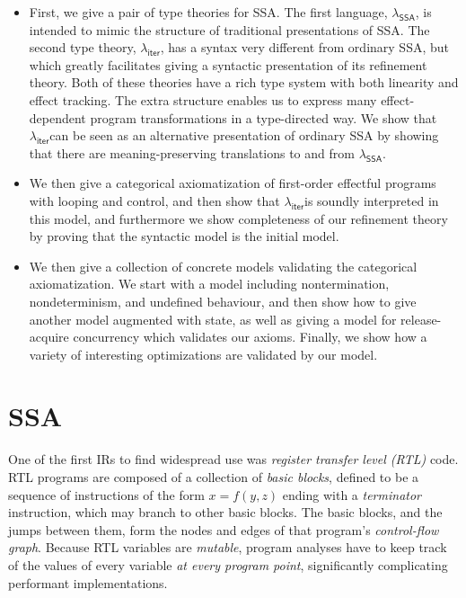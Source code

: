 \documentclass[acmsmall,screen,review]{acmart}
\newcommand{\ms}[1]{\ensuremath{\mathsf{#1}}}
\newcommand{\subiterexp}{\texorpdfstring{\(\lambda_{\ms{iter}}\)}{lambda-iter}}
\newcommand{\isotopessa}{\(\lambda_{\ms{SSA}}\)}
\begin{document}
\begin{itemize}
\item First, we give a pair of type theories for SSA. The first
  language, \isotopessa, is intended to mimic the structure of
  traditional presentations of SSA. The second type theory,
  \subiterexp, has a syntax very different from ordinary SSA, but
  which greatly facilitates giving a syntactic presentation of its
  refinement theory. Both of these theories have a rich type system
  with both linearity and effect tracking. The extra structure enables
  us to express many effect-dependent program transformations in a
  type-directed way. We show that \subiterexp can be seen as an
  alternative presentation of ordinary SSA by showing that there are
  meaning-preserving translations to and from \isotopessa.
\item We then give a categorical axiomatization of first-order
  effectful programs with looping and control, and then show that
  \subiterexp is soundly interpreted in this model, and furthermore we
  show completeness of our refinement theory by proving that the
  syntactic model is the initial model.
\item We then give a collection of concrete models validating the
  categorical axiomatization. We start with a model including
  nontermination, nondeterminism, and undefined behaviour, and then
  show how to give another model augmented with state, as well as
  giving a model for release-acquire concurrency which validates our
  axioms. Finally, we show how a variety of interesting optimizations
  are validated by our model.
\end{itemize}

\section{SSA}

\label{sec:ssa-intro}

One of the first IRs to find widespread use was \emph{register transfer level (RTL)} code. RTL
programs are composed of a collection of \emph{basic blocks}, defined to be a sequence of
instructions of the form $x = f(y, z)$ ending with a \emph{terminator} instruction, which may branch
to other basic blocks. The basic blocks, and the jumps between them, form the nodes and edges of
that program's \emph{control-flow graph}. Because RTL variables are \emph{mutable}, program analyses
have to keep track of the values of every variable \emph{at every program point}, significantly
complicating performant implementations.
\end{document}
